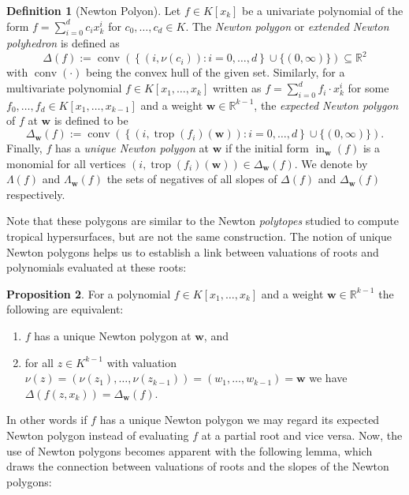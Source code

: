 \documentclass[
  paper=a4,
  titlepage,
  bibliography=totoc,
  listof=totoc,
  pagesize=pdftex
]{scrartcl}
\numberwithin{figure}{section}
\numberwithin{equation}{section}
\numberwithin{table}{section}
\newcommand*\setR{\mathds{R}}
\let\vec\mathbf
\DeclareMathOperator{\trop}{trop}
\DeclareMathOperator{\initial}{in}
\DeclareMathOperator{\conv}{conv}
\theoremstyle{definition}
\newtheorem{definition}{Definition}
\newtheorem{proposition}[definition]{Proposition}
\numberwithin{definition}{section}
\begin{document}
\begin{definition}[Newton Polyon]
  Let $f \in K[x_k]$ be a univariate polynomial of the form $f = \sum_{i=0}^d c_i x_k^i$
  for $c_0, \dots, c_d \in K$. The \emph{Newton polygon} or \emph{extended Newton
  polyhedron} is defined as
  \[
    \Delta(f) := \conv \left(
      \left\{ (i, \nu(c_i)) : i = 0, \dots, d \right\}
      \cup \{ (0, \infty) \}
    \right)
    \subseteq \setR^2
  \]
  with $\conv(\cdot)$ being the convex hull of the given set. Similarly, for a
  multivariate polynomial $f \in K[x_1, \dots, x_k]$ written as $f = \sum_{i=0}^d f_i
  \cdot x_k^i$ for some $f_0, \dots, f_d \in K[x_1, \dots, x_{k-1}]$ and a weight $\vec w
  \in \setR^{k-1}$, the \emph{expected Newton polygon} of $f$ at $\vec w$ is defined to be
  \[
    \Delta_{\vec w}(f) := \conv\left(
      \left\{ (i, \trop(f_i)(\vec w)) : i = 0, \dots, d \right\}
      \cup \{ (0, \infty) \}
    \right).
  \]
  Finally, $f$ has a \emph{unique Newton polygon} at $\vec w$ if the initial form
  $\initial_{\vec w}(f)$ is a monomial for all vertices $(i, \trop(f_i)(\vec w)) \in
  \Delta_{\vec w}(f)$. We denote by $\Lambda(f)$ and $\Lambda_{\vec w}(f)$ the sets of
  negatives of all slopes of $\Delta(f)$ and $\Delta_{\vec w}(f)$ respectively.
  \label{def:newtonPoly}
\end{definition}

Note that these polygons are similar to the Newton \emph{polytopes} studied to compute
tropical hypersurfaces, but are not the same construction. The notion of unique Newton
polygons helps us to establish a link between valuations of roots and polynomials
evaluated at these roots:

\begin{proposition}
  \label{prp:expectedNewt}
  For a polynomial $f \in K[x_1, \dots, x_k]$ and a weight $\vec w \in \setR^{k-1}$ the
  following are equivalent:
  \begin{enumerate}
    \item $f$ has a unique Newton polygon at $\vec w$, and
    \item for all $z \in K^{k-1}$ with valuation $\nu(z) = (\nu(z_1), \dots, \nu(z_{k-1}))
      = (w_1, \dots, w_{k-1}) = \vec w$ we have $\Delta(f(z, x_k)) = \Delta_{\vec w}(f)$.
  \end{enumerate}
\end{proposition}

In other words if $f$ has a unique Newton polygon we may regard its expected Newton
polygon instead of evaluating $f$ at a partial root and vice versa. Now, the use of Newton
polygons becomes apparent with the following lemma, which draws the connection between
valuations of roots and the slopes of the Newton polygons:
\end{document}
